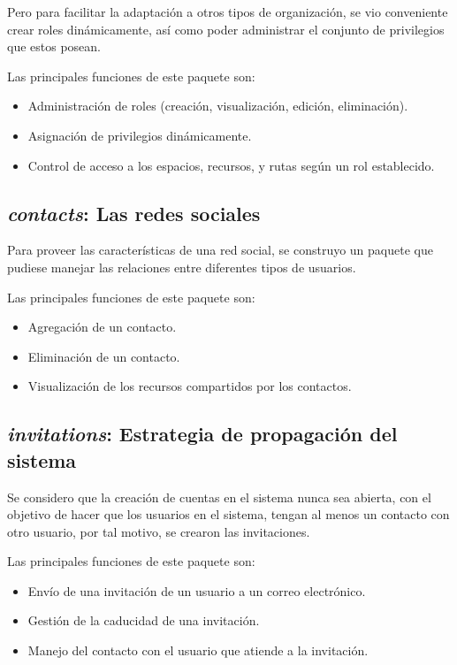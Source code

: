 Pero para facilitar la adaptación a otros tipos de organización, se vio
conveniente crear roles dinámicamente, así como poder administrar el conjunto
de privilegios que estos posean.

Las principales funciones de este paquete son:

\begin{itemize}
\item Administración de roles (creación, visualización, edición, eliminación).
\item Asignación de privilegios dinámicamente.
\item Control de acceso a los espacios, recursos, y rutas según un rol
establecido.
\end{itemize}

\subsection{\emph{contacts}: Las redes sociales}
Para proveer las características de una red social, se construyo un paquete que
pudiese manejar las relaciones entre diferentes tipos de usuarios.

Las principales funciones de este paquete son:

\begin{itemize}
\item Agregación de un contacto.
\item Eliminación de un contacto.
\item Visualización de los recursos compartidos por los contactos.
\end{itemize}

\subsection{\emph{invitations}: Estrategia de propagación del sistema}
Se considero que la creación de cuentas en el sistema nunca sea abierta, con el
objetivo de hacer que los usuarios en el sistema, tengan al menos un contacto
con otro usuario, por tal motivo, se crearon las invitaciones.

Las principales funciones de este paquete son:

\begin{itemize}
\item Envío de una invitación de un usuario a un correo electrónico.
\item Gestión de la caducidad de una invitación.
\item Manejo del contacto con el usuario que atiende a la invitación.
\end{itemize}

